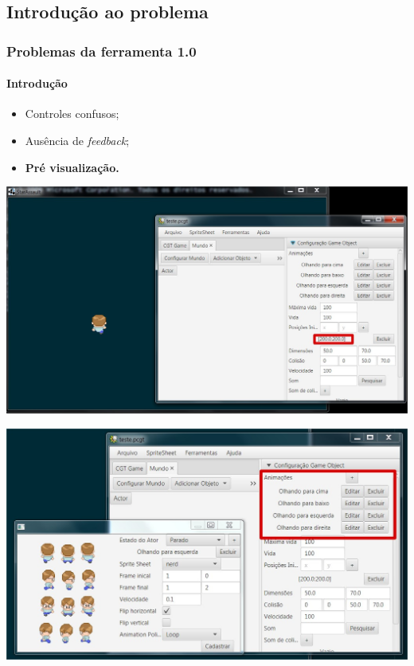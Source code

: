 \documentclass[]{beamer}
\begin{document}
   \subsection{Introdução ao problema}
   \begin{frame}
      \frametitle{Problemas da ferramenta 1.0}
      \framesubtitle{Introdução}
      \begin{itemize}
         \item Controles confusos;
         \item Ausência de \emph{feedback};
         \item \textbf{Pré visualização.}
      \end{itemize}
   \end{frame}
   \begin{frame}
      \includegraphics[width=\textwidth]{images/problema-1.jpg}
   \end{frame}

   \begin{frame}
      \includegraphics[width=\textwidth]{images/problema-2.jpg}
   \end{frame}
\end{document}
